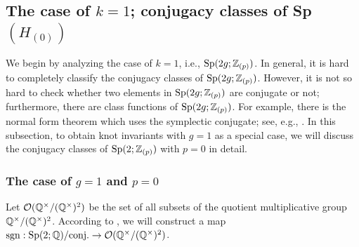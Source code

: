 \documentclass{article}
\theoremstyle{plain}
\theoremstyle{definition}
\newcommand{\ra}{\rightarrow}
\newcommand{\Q}{{\Bbb Q}}
\newcommand{\Z}{{\Bbb Z}}
\newcommand{\Sp}{{\rm Sp}}
\begin{document}
{\subsection{The case of $k=1$; conjugacy classes of Sp$(H_{(0)})$ }
\label{ooi21}
We begin by analyzing the case of $k=1$, i.e., $\Sp(2g; \Z_{(p)})$. In general, it is hard to completely classify the conjugacy classes of $\Sp(2g; \Z_{(p)})$. However, it is not so hard to check whether two elements in $\Sp (2g; \Z_{(p)})$ are conjugate or not; furthermore, there are class functions of $\Sp (2g; \Z_{(p)})$. For example, there is the normal form theorem which uses the symplectic conjugate; see, e.g., \cite{Gutt}. In this subsection, to obtain knot invariants with $g=1$ as a special case, we will discuss the conjugacy classes of $\Sp(2; \Z_{(p)})$ with $p=0$ in detail.

\subsubsection{The case of $g=1$ and $p=0$}
\label{ooi22}
Let $\mathcal{O}(\Q^{\times }/ (\Q^{\times } )^2)$ be the set of all subsets of the quotient multiplicative group $ \Q^{\times }/ (\Q^{\times } )^2$. According to \cite{Ca}, we will construct a map $\mathrm{sgn}: \Sp(2; \Q) /\mathrm{conj.}\ra \mathcal{O}(\Q^{\times }/ (\Q^{\times } )^2)$.

}
\end{document}
